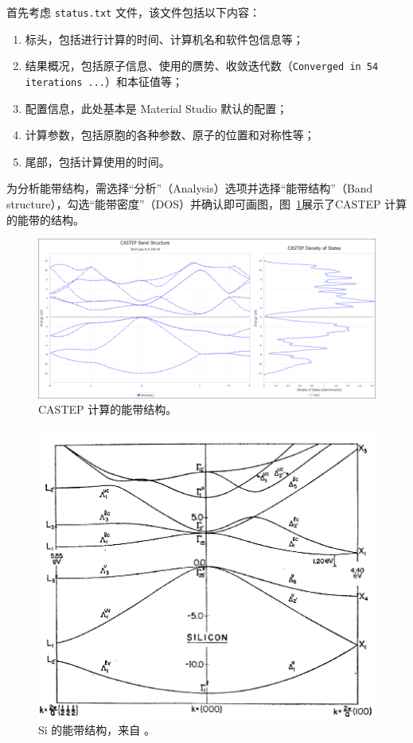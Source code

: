 首先考虑 \verb|status.txt| 文件，该文件包括以下内容：
\begin{enumerate}
    \item 标头，包括进行计算的时间、计算机名和软件包信息等；
    \item 结果概况，包括原子信息、使用的赝势、收敛迭代数（\texttt{Converged in 54 iterations ...}）和本征值等；
    \item 配置信息，此处基本是 Material Studio 默认的配置；
    \item 计算参数，包括原胞的各种参数、原子的位置和对称性等；
    \item 尾部，包括计算使用的时间。
\end{enumerate}

为分析能带结构，需选择“分析”（Analysis）选项并选择“能带结构”（Band structure），勾选“能带密度”（DOS）并确认即可画图，图~\ref{fig:si-band-structure-castep}展示了CASTEP 计算的能带的结构。

\begin{figure}[ht!]
    \centering
    \includegraphics[width=0.9\linewidth]{results/si-band-structure-castep.png}
    \caption{CASTEP 计算的能带结构。}
    \label{fig:si-band-structure-castep}
\end{figure}

\begin{figure}[ht!]
    \centering
    \includegraphics[width=0.6\linewidth]{results/si-band-structure-reference.png}
    \caption{Si 的能带结构，来自 \cite{cardona_energy_band_1966}。}
    \label{fig:si-band-structure-reference}
\end{figure}

